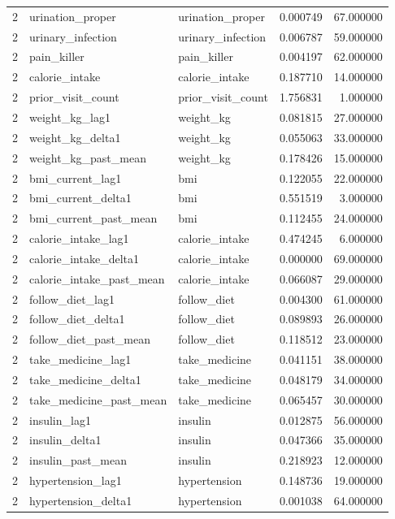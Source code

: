 \begin{longtable}{rllrr}
2 & urination\_proper & urination\_proper & 0.000749 & 67.000000 \\
2 & urinary\_infection & urinary\_infection & 0.006787 & 59.000000 \\
2 & pain\_killer & pain\_killer & 0.004197 & 62.000000 \\
2 & calorie\_intake & calorie\_intake & 0.187710 & 14.000000 \\
2 & prior\_visit\_count & prior\_visit\_count & 1.756831 & 1.000000 \\
2 & weight\_kg\_lag1 & weight\_kg & 0.081815 & 27.000000 \\
2 & weight\_kg\_delta1 & weight\_kg & 0.055063 & 33.000000 \\
2 & weight\_kg\_past\_mean & weight\_kg & 0.178426 & 15.000000 \\
2 & bmi\_current\_lag1 & bmi & 0.122055 & 22.000000 \\
2 & bmi\_current\_delta1 & bmi & 0.551519 & 3.000000 \\
2 & bmi\_current\_past\_mean & bmi & 0.112455 & 24.000000 \\
2 & calorie\_intake\_lag1 & calorie\_intake & 0.474245 & 6.000000 \\
2 & calorie\_intake\_delta1 & calorie\_intake & 0.000000 & 69.000000 \\
2 & calorie\_intake\_past\_mean & calorie\_intake & 0.066087 & 29.000000 \\
2 & follow\_diet\_lag1 & follow\_diet & 0.004300 & 61.000000 \\
2 & follow\_diet\_delta1 & follow\_diet & 0.089893 & 26.000000 \\
2 & follow\_diet\_past\_mean & follow\_diet & 0.118512 & 23.000000 \\
2 & take\_medicine\_lag1 & take\_medicine & 0.041151 & 38.000000 \\
2 & take\_medicine\_delta1 & take\_medicine & 0.048179 & 34.000000 \\
2 & take\_medicine\_past\_mean & take\_medicine & 0.065457 & 30.000000 \\
2 & insulin\_lag1 & insulin & 0.012875 & 56.000000 \\
2 & insulin\_delta1 & insulin & 0.047366 & 35.000000 \\
2 & insulin\_past\_mean & insulin & 0.218923 & 12.000000 \\
2 & hypertension\_lag1 & hypertension & 0.148736 & 19.000000 \\
2 & hypertension\_delta1 & hypertension & 0.001038 & 64.000000 \\

\end{longtable}

